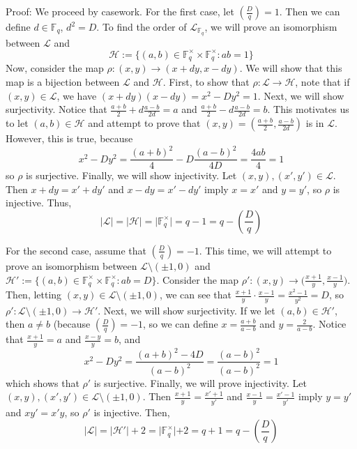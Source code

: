 \documentclass{article}
\newcommand{\legendre}[2]{\genfrac{(}{)}{}{}{#1}{#2}}
\begin{document}
Proof: We proceed by casework. For the first case, let $\legendre{D}{q} = 1$. Then we can define $d \in \mathbb{F}_q$, $d^2 = D$. To find the order of $\mathcal{L}_{\mathbb{F}_q}$, we will prove an isomorphism between $\mathcal{L}$ and $$\mathcal{H} := \{(a,b)\in \mathbb{F}_q^\times \times \mathbb{F}_q^\times : ab = 1 \}$$ Now, consider the map $\rho : (x,y) \rightarrow (x+dy,x-dy)$. We will show that this map is a bijection between $\mathcal{L}$ and $\mathcal{H}$. First, to show that $\rho : \mathcal{L} \rightarrow \mathcal{H}$, note that if $(x,y) \in \mathcal{L}$, we have $(x+dy)(x-dy) = x^2-Dy^2 = 1$. Next, we will show surjectivity. Notice that $\frac{a+b}{2} + d\frac{a-b}{2d} = a$ and $\frac{a+b}{2} - d\frac{a-b}{2d} = b$. This motivates us to let $(a,b) \in \mathcal{H}$ and attempt to prove that $(x,y) = (\frac{a+b}{2}, \frac{a-b}{2d})$ is in $\mathcal{L}$. However, this is true, because $$x^2 - Dy^2 = \frac{(a+b)^2}{4} - D\frac{(a-b)^2}{4D} = \frac{4ab}{4} = 1$$ so $\rho$ is surjective. Finally, we will show injectivity. Let $(x,y),(x',y') \in \mathcal{L}$. Then $x+dy = x' + dy'$ and $x-dy = x'-dy'$ imply $x=x'$ and $y=y'$, so $\rho$ is injective. Thus, $$\lvert \mathcal{L} \rvert = \lvert \mathcal{H} \rvert = \lvert \mathbb{F}_q^\times \rvert = q - 1 = q - \legendre{D}{q}$$

For the second case, assume that $\legendre{D}{q} = -1$. This time, we will attempt to prove an isomorphism between $\mathcal{L} \setminus (\pm 1,0)$ and $\mathcal{H}' := \{(a,b) \in \mathbb{F}_q^\times \times \mathbb{F}_q^\times : ab = D \}$. Consider the map $\rho' : (x,y) \rightarrow \bigg(\frac{x+1}{y},\frac{x-1}{y}\bigg)$. Then, letting $(x,y) \in \mathcal{L} \setminus (\pm 1,0)$, we can see that $\frac{x+1}{y}\cdot\frac{x-1}{y} = \frac{x^2-1}{y^2} = D$, so $\rho' : \mathcal{L} \setminus (\pm 1,0) \rightarrow \mathcal{H}'$. Next, we will show surjectivity. If we let $(a,b) \in \mathcal{H}'$, then $a \neq b$ (because $\legendre{D}{q} = -1$, so we can define $x = \frac{a+b}{a-b}$ and $y = \frac{2}{a-b}$. Notice that $\frac{x+1}{y} = a$ and $\frac{x-y}{y} = b$, and $$x^2 - Dy^2 = \frac{(a+b)^2 - 4D}{(a-b)^2} = \frac{(a-b)^2}{(a-b)^2} = 1$$ which shows that $\rho'$ is surjective. Finally, we will prove injectivity. Let $(x,y),(x',y') \in \mathcal{L} \setminus (\pm 1,0)$. Then $\frac{x+1}{y} = \frac{x'+1}{y'}$ and $\frac{x-1}{y} = \frac{x'-1}{y'}$ imply $y = y'$ and $xy' = x'y$, so $\rho'$ is injective. Then, $$\lvert \mathcal{L} \rvert = \lvert \mathcal{H}' \rvert + 2 = \lvert \mathbb{F}_q^\times \lvert + 2 = q + 1 = q - \legendre{D}{q}$$
\end{document}
